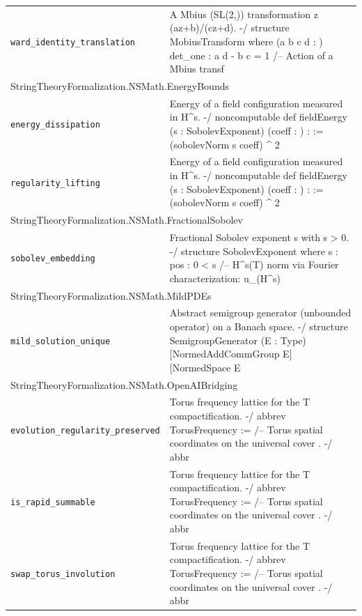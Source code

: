 \begin{longtable}{p{}p{}}
\quad\texttt{\footnotesize ward\_identity\_translation} & {\footnotesize A Mbius (SL(2,)) transformation z  (az+b)/(cz+d). -/ structure MobiusTransform where (a b c d : ) det\_one : a d - b c = 1 /-- Action of a Mbius transf} \\
\multicolumn{2}{l}{\textsf{\small StringTheoryFormalization.NSMath.EnergyBounds}} \\
\quad\texttt{\footnotesize energy\_dissipation} & {\footnotesize Energy of a field configuration measured in H\^{}s. -/ noncomputable def fieldEnergy (s : SobolevExponent) (coeff :     ) :  := (sobolevNorm s coeff) \^{} 2} \\
\quad\texttt{\footnotesize regularity\_lifting} & {\footnotesize Energy of a field configuration measured in H\^{}s. -/ noncomputable def fieldEnergy (s : SobolevExponent) (coeff :     ) :  := (sobolevNorm s coeff) \^{} 2} \\
\multicolumn{2}{l}{\textsf{\small StringTheoryFormalization.NSMath.FractionalSobolev}} \\
\quad\texttt{\footnotesize sobolev\_embedding} & {\footnotesize Fractional Sobolev exponent s   with s > 0. -/ structure SobolevExponent where s :  pos : 0 < s /-- H\^{}s(T) norm via Fourier characterization: u\_(H\^{}s) } \\
\multicolumn{2}{l}{\textsf{\small StringTheoryFormalization.NSMath.MildPDEs}} \\
\quad\texttt{\footnotesize mild\_solution\_unique} & {\footnotesize Abstract semigroup generator (unbounded operator) on a Banach space. -/ structure SemigroupGenerator (E : Type) [NormedAddCommGroup E] [NormedSpace  E} \\
\multicolumn{2}{l}{\textsf{\small StringTheoryFormalization.NSMath.OpenAIBridging}} \\
\quad\texttt{\footnotesize evolution\_regularity\_preserved} & {\footnotesize Torus frequency lattice    for the T compactification. -/ abbrev TorusFrequency :=    /-- Torus spatial coordinates on the universal cover   . -/ abbr} \\
\quad\texttt{\footnotesize is\_rapid\_summable} & {\footnotesize Torus frequency lattice    for the T compactification. -/ abbrev TorusFrequency :=    /-- Torus spatial coordinates on the universal cover   . -/ abbr} \\
\quad\texttt{\footnotesize swap\_torus\_involution} & {\footnotesize Torus frequency lattice    for the T compactification. -/ abbrev TorusFrequency :=    /-- Torus spatial coordinates on the universal cover   . -/ abbr} \\

\end{longtable}
